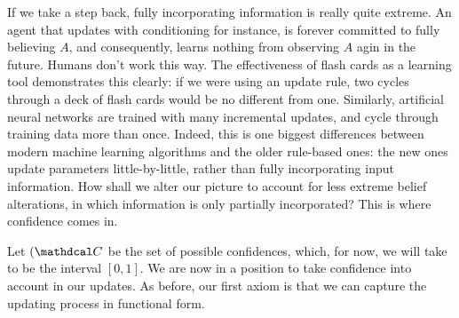 \documentclass{article}
\def\cofunc{commitment function}
\def\confdom{\mathdcal C}
\begin{document}
If we take a step back, fully incorporating information is really quite extreme. 
An agent that updates with conditioning for instance, is forever committed to fully believing $A$, and consequently, learns nothing from observing $A$ agin in the future. 
Humans don't work this way. 
The effectiveness of flash cards as a learning tool demonstrates this clearly:
if we were using an update rule, two cycles through a deck of flash cards would be no different from one.
Similarly, artificial neural networks are trained with many incremental updates, and cycle through training data more than once.
Indeed, this is one biggest differences between modern machine learning algorithms and the older rule-based ones: the new ones update parameters little-by-little, rather than fully incorporating input information.
How shall we alter our picture to account for less extreme belief alterations, in which information is only partially incorporated?
This is where confidence comes in. 





Let $(\confdom$ be the set of possible confidences, which, for now, we will take to be the interval $[0, 1]$. 
We are now in a position to take confidence into account in our updates. 
As before, our first axiom is that we can capture the updating process in functional form. 

\end{document}
